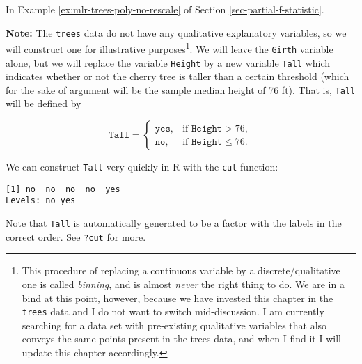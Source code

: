\documentclass[]{book}
\newenvironment{Shaded}{\begin{snugshade}}{\end{snugshade}}
\newcommand{\KeywordTok}[1]{\textcolor[rgb]{0.13,0.29,0.53}{\textbf{{#1}}}}
\newcommand{\DataTypeTok}[1]{\textcolor[rgb]{0.13,0.29,0.53}{{#1}}}
\newcommand{\DecValTok}[1]{\textcolor[rgb]{0.00,0.00,0.81}{{#1}}}
\newcommand{\StringTok}[1]{\textcolor[rgb]{0.31,0.60,0.02}{{#1}}}
\newcommand{\OtherTok}[1]{\textcolor[rgb]{0.56,0.35,0.01}{{#1}}}
\newcommand{\NormalTok}[1]{{#1}}
\let\rmarkdownfootnote\footnote%
\def\footnote{\protect\rmarkdownfootnote}
\numberwithin{equation}{chapter}
\numberwithin{figure}{chapter}
\theoremstyle{plain}
\theoremstyle{definition}
\theoremstyle{remark}
\theoremstyle{definition}
\theoremstyle{definition}
\theoremstyle{remark}
\begin{document}
In Example \ref{ex:mlr-trees-poly-no-rescale} of Section
\ref{sec-partial-f-statistic}.

\textbf{Note:} The \texttt{trees} data do not have any qualitative
explanatory variables, so we will construct one for illustrative
purposes\footnote{This procedure of replacing a continuous variable by a
  discrete/qualitative one is called \emph{binning}, and is almost
  \emph{never} the right thing to do. We are in a bind at this point,
  however, because we have invested this chapter in the \texttt{trees}
  data and I do not want to switch mid-discussion. I am currently
  searching for a data set with pre-existing qualitative variables that
  also conveys the same points present in the trees data, and when I
  find it I will update this chapter accordingly.}. We will leave the
\texttt{Girth} variable alone, but we will replace the variable
\texttt{Height} by a new variable \texttt{Tall} which indicates whether
or not the cherry tree is taller than a certain threshold (which for the
sake of argument will be the sample median height of 76 ft). That is,
\texttt{Tall} will be defined by

\begin{equation} \mathtt{Tall} = \begin{cases} \mathtt{yes}, & \mbox{if }\mathtt{Height} > 76,\\ \mathtt{no}, & \mbox{if }\mathtt{Height}\leq 76. \end{cases} \end{equation}

We can construct \texttt{Tall} very quickly in R with the \texttt{cut}
function:

\begin{Shaded}
\end{Shaded}

\begin{verbatim}
[1] no  no  no  no  yes
Levels: no yes
\end{verbatim}

Note that \texttt{Tall} is automatically generated to be a factor with
the labels in the correct order. See \texttt{?cut} for more.
\end{document}

